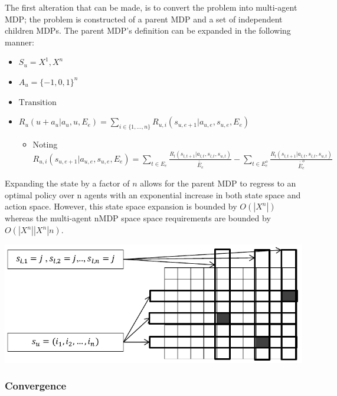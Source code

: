 \documentclass[compsoc,journal,letterpaper,10pt,draftclsnofoot,onecolumn]{IEEEtran}
\begin{document}
The first alteration that can be made, is to convert the problem into
multi-agent MDP; the problem is constructed of a parent MDP and a set of
independent children MDPs. The parent MDP's definition can be expanded
in the following manner:

\begin{itemize}
\item
  \(S_{u}  = X^{1},X^{n}\)
\item
  \(A_{u} = {\{ - 1, 0, 1\}}^{n}\)
\item
  \(\text{Transition}\)
\item
  \(R_{u}\left( u + a_{u}|a_{u}, u, E_{e} \right) = \sum_{i \in \{ 1,\ldots,n\}}R_{u,i}\left( s_{u,e + 1}|a_{u,e}, s_{u,e}, E_{e} \right)\)

  \begin{itemize}
  \item
    Noting
    \(R_{u,i}\left( s_{u,e + 1}|a_{u,e}, s_{u,e}, E_{e} \right) = \sum_{t \in E_{e}}^{\ }\frac{R_{l}\left( s_{l, t + 1}|a_{l,t}, s_{l,t}, s_{u,t} \right)}{\overline{\overline E}_{e}} - \sum_{t \in E_{e}^{o}}^{\ }\frac{R_{l}\left( s_{l,t + 1}|a_{l,t}, s_{l,t}, s_{u,t} \right)}{\overline{\overline E}_{e}^{o}}\)
  \end{itemize}
\end{itemize}

Expanding the state by a factor of \(n\) allows for the parent MDP to
regress to an optimal policy over \(\text{n\ }\)agents with an
exponential increase in both state space and action space. However, this
state space expansion is bounded by \(O(\left| X^{n} \right|)\) whereas
the multi-agent nMDP space space requirements are bounded by
\(O(\left| X^{n} \right|\left| X^{n} \right|n)\).

 
\includegraphics{media/figure8.pdf}
 


\subsubsection{Convergence}\label{convergence-1}
\end{document}
